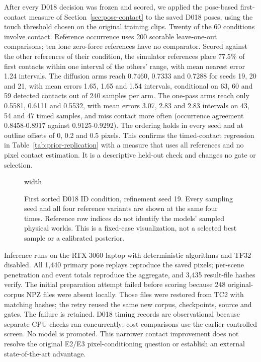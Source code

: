 \documentclass[11pt,a4paper]{article}
\begin{document}
\label{sec:d018-contact-timing}After every D018 decision was frozen and scored,
we applied the pose-based first-contact measure of Section~\ref{sec:pose-contact}
to the saved D018 poses, using the touch threshold chosen on the original training
clips. Twenty of the 60 conditions involve contact. Reference occurrence uses 200 scorable leave-one-out comparisons; ten lone zero-force references have no comparator. Scored against the other
references of their condition, the simulator references place 77.5\% of first
contacts within one interval of the others' range, with mean nearest error 1.24
intervals. The diffusion arms reach 0.7460, 0.7333 and 0.7288 for seeds 19, 20 and 21,
with mean errors 1.65, 1.65 and 1.54 intervals, conditional on 63, 60 and 59 detected contacts out of 240 samples per arm. The one-pass arms reach only 0.5581,
0.6111 and 0.5532, with mean errors 3.07, 2.83 and 2.83 intervals on 43, 54 and 47 timed samples, and miss contact
more often (occurrence agreement 0.8458-0.8917 against 0.9125-0.9292). The ordering
holds in every seed and at outline offsets of 0, 0.2 and 0.5 pixels. This confirms
the timed-contact regression in Table~\ref{tab:prior-replication} with a measure that
uses all references and no pixel contact estimation. It is a descriptive held-out
check and changes no gate or selection.

\begin{figure}[!ht]
\centering
\pdfximage width\linewidth{report/figures/prior_replication.png}\pdfrefximage\pdflastximage
\caption{First sorted D018 ID condition, refinement seed 19. Every sampling seed
and all four reference variants are shown at the same four times. Reference
row indices do not identify the models' sampled physical worlds. This is a
fixed-case visualization, not a selected best sample or a calibrated posterior.}
\label{fig:prior-replication}
\end{figure}

Inference runs on the RTX 3060 laptop with deterministic algorithms and TF32
disabled. All 1,440 primary pose replays reproduce the saved pixels; per-scene
penetration and event totals reproduce the aggregate, and 3,435 result-file
hashes verify. The initial preparation attempt failed before scoring because
248 original-corpus NPZ files were absent locally. Those files were restored
from TC2 with matching hashes; the retry reused the same new corpus,
checkpoints, source and gates. The failure is retained. D018 timing records are
observational because separate CPU checks ran concurrently; cost comparisons
use the earlier controlled screen. No model is promoted. This narrower
contact improvement does not resolve the original E2/E3 pixel-conditioning
question or establish an external state-of-the-art advantage.
\end{document}
